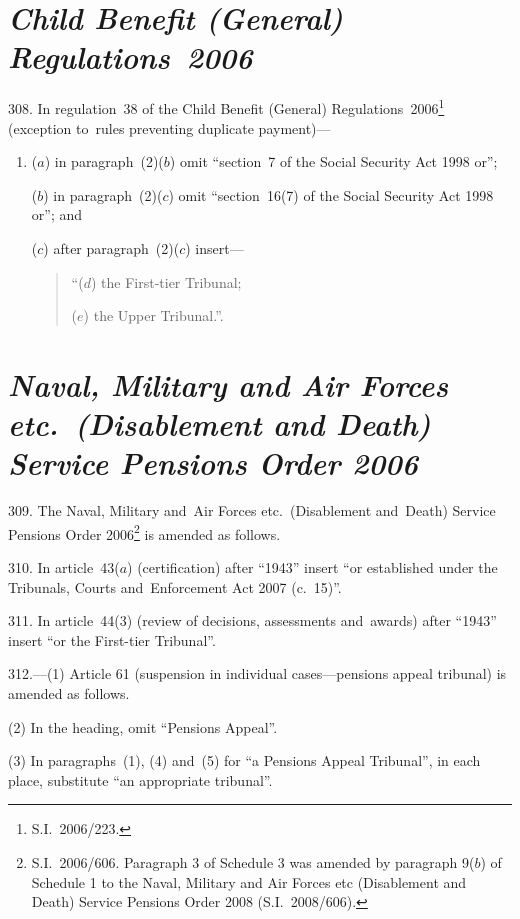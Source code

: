 \documentclass[12pt,a4paper]{article}
\begin{document}
\section*{\itshape Child Benefit (General) Regulations~2006}

308.  In regulation~38 of the Child Benefit (General) Regulations~2006\footnote{S.I.~2006/223.} (exception to~rules preventing duplicate payment)—
\begin{enumerate}\item[]
($a$) in paragraph~(2)($b$)  omit “section~7 of the Social Security Act 1998 or”;

($b$) in paragraph~(2)($c$)  omit “section~16(7) of the Social Security Act 1998 or”; and

($c$) after paragraph~(2)($c$)  insert—
\begin{quotation}
“($d$) the First-tier Tribunal;

($e$) the Upper Tribunal.”.
\end{quotation}
\end{enumerate}

\section*{\itshape\sloppy Naval, Military and Air Forces etc.\ (Disablement and Death) Service Pensions Order 2006}

309.  The Naval, Military and~Air Forces etc.\ (Disablement and~Death) Service Pensions Order 2006\footnote{S.I.~2006/606. Paragraph 3 of Schedule 3 was amended by paragraph 9($b$) of Schedule 1 to the Naval, Military and Air Forces etc (Disablement and Death) Service Pensions Order 2008 (S.I.~2008/606).} is amended as follows.

\medskip

310.  In article~43($a$)  (certification) after “1943” insert “or established under the Tribunals, Courts and~Enforcement Act 2007 (c.~15)”.

\medskip

311.  In article~44(3) (review of decisions, assessments and~awards) after “1943” insert “or the First-tier Tribunal”.

\medskip

312.---(1)  Article 61 (suspension in individual cases---pensions appeal tribunal) is amended as follows.

(2) In the heading, omit “Pensions Appeal”.

(3) In paragraphs~(1), (4) and~(5) for “a Pensions Appeal Tribunal”, in each place, substitute “an appropriate tribunal”.
\end{document}
